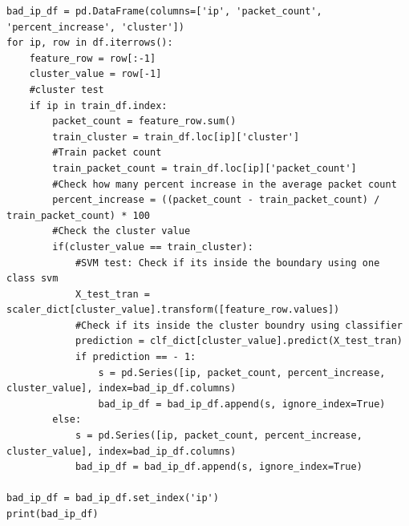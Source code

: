 \documentclass{article}
\begin{document}
\begin{verbatim}
bad_ip_df = pd.DataFrame(columns=['ip', 'packet_count', 'percent_increase', 'cluster'])
for ip, row in df.iterrows():
    feature_row = row[:-1]
    cluster_value = row[-1]
    #cluster test
    if ip in train_df.index:
        packet_count = feature_row.sum()
        train_cluster = train_df.loc[ip]['cluster']
        #Train packet count
        train_packet_count = train_df.loc[ip]['packet_count']
        #Check how many percent increase in the average packet count
        percent_increase = ((packet_count - train_packet_count) / train_packet_count) * 100
        #Check the cluster value
        if(cluster_value == train_cluster):
            #SVM test: Check if its inside the boundary using one class svm
            X_test_tran = scaler_dict[cluster_value].transform([feature_row.values])
            #Check if its inside the cluster boundry using classifier
            prediction = clf_dict[cluster_value].predict(X_test_tran)
            if prediction == - 1:
                s = pd.Series([ip, packet_count, percent_increase, cluster_value], index=bad_ip_df.columns)
                bad_ip_df = bad_ip_df.append(s, ignore_index=True)
        else:
            s = pd.Series([ip, packet_count, percent_increase, cluster_value], index=bad_ip_df.columns)
            bad_ip_df = bad_ip_df.append(s, ignore_index=True)

bad_ip_df = bad_ip_df.set_index('ip')
print(bad_ip_df)
\end{verbatim}
\textbf{\Large{}}
\begin{verbatim}

\end{verbatim}
\end{document}
